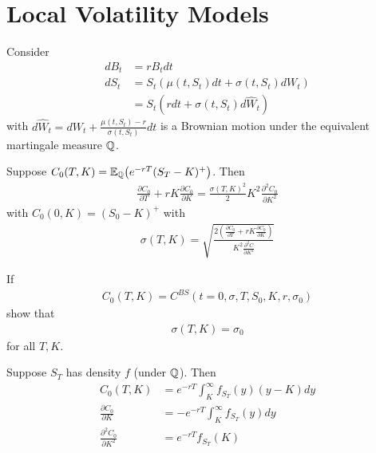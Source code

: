 \chapter{Local Volatility Models}
\label{cha:local-volat-models}

Consider
\begin{align}
  \label{eq:102}
  dB_{t} &= r B_{t} dt \\
  dS_{t} &= S_{t} (\mu(t, S_{t}) dt + \sigma(t, S_{t}) dW_{t})  \\
  &= S_{t}(r dt + \sigma(t, S_{t}) d \hat W_{t})
\end{align} with $d \hat W_{t} = dW_{t} + \frac{\mu(t, S_{t}) -
  r}{\sigma(t, S_{t})} dt$ is a Brownian motion under the equivalent
martingale measure $\Q$.

\begin{thm}[Dupire]
  \label{defn:market_models:3}
  Suppose $C_{0}(T, K) = \E{e^{-rT}(S_{T} - K)^{+}}{\Q}$.  Then
  \begin{align}
    \label{eq:103}
    \frac{\partial C_{0}}{\partial T} + rK \frac{\partial
      C_{0}}{\partial K} = \frac{\sigma(T, K)^{2}}{2} K^{2}
    \frac{\partial^{2} C_{0}}{\partial K^{2}}
  \end{align} with $C_{0}(0, K) = (S_{0} - K)^{+}$ with
  \begin{align}
    \label{eq:104}
    \sigma(T, K) = \sqrt{\frac{2(\frac{\partial C_{0}}{\partial T} +
        rK \frac{\partial C_{0}}{\partial K})}{K^{2}
        \frac{\partial^{2} C}{\partial K^{2}}}}
  \end{align}
\end{thm}

\begin{exer}
  If
  \begin{align}
    \label{eq:105}
    C_{0}(T, K) = C^{BS}(t = 0, \sigma, T, S_{0}, K, r, \sigma_{0})
  \end{align}
  show that
  \begin{align}
    \label{eq:106}
    \sigma(T, K) = \sigma_{0} 
  \end{align} for all $T, K$.
\end{exer}

\begin{lem}
  Suppose $S_{T}$ has density $f$ (under $\Q$). Then
  \begin{align}
    \label{eq:107}
    C_{0}(T, K) &= e^{-rT} \int_{K}^{\infty} f_{S_{T}}(y)(y-K) dy \\
    \frac{\partial C_{0}}{\partial K} &= -e^{-rT} \int_{K}^{\infty}
    f_{S_{T}}(y) dy \\
    \frac{\partial^{2} C_{0}}{\partial K^{2}} &= e^{-rT} f_{S_{T}}(K)
  \end{align}
\end{lem}

